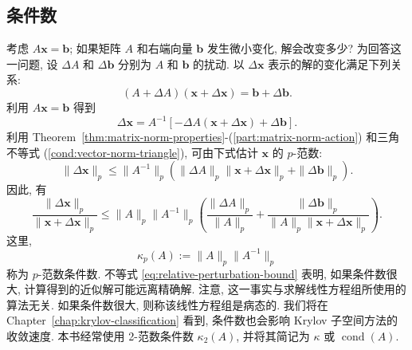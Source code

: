 \subsection{{条件数}}\label{sec:condition-number}
{考虑 $A\bm x=\bm b$; 如果矩阵 $A$ 和右端向量 $\bm b$ 发生微小变化, 解会改变多少? 为回答这一问题, 设 $\Delta A$ 和 $\Delta\bm b$ 分别为 $A$ 和 $\bm b$ 的扰动. 以 $\Delta\bm x$ 表示的解的变化满足下列关系:}
\[
(A+\Delta A)(\bm x+\Delta\bm x)=\bm b+\Delta\bm b.
\]
{利用 $A\bm x=\bm b$ 得到}
\[
\Delta\bm x=A^{-1}[-\Delta A(\bm x+\Delta\bm x)+\Delta\bm b].
\]
{利用 Theorem~\ref{thm:matrix-norm-properties}-(\ref{part:matrix-norm-action}) 和三角不等式 (\ref{cond:vector-norm-triangle}), 可由下式估计 $\bm x$ 的 $p$-范数:}
\[
\|\Delta\bm x\|_p\le\|A^{-1}\|_p(\|\Delta A\|_p\|\bm x+\Delta\bm x\|_p+\|\Delta\bm b\|_p).
\]
{因此, 有}
\begin{equation}\label{eq:relative-perturbation-bound}
\frac{\|\Delta\bm x\|_p}{\|\bm x+\Delta\bm x\|_p}
\le\|A\|_p\|A^{-1}\|_p
\left(\frac{\|\Delta A\|_p}{\|A\|_p}+
\frac{\|\Delta\bm b\|_p}{\|A\|_p\|\bm x+\Delta\bm x\|_p}\right).
\end{equation}
{这里,}
\begin{equation}\label{eq:p-norm-condition-number}
\kappa_p(A):=\|A\|_p\|A^{-1}\|_p
\end{equation}
{称为 $p$-范数条件数. 不等式 \eqref{eq:relative-perturbation-bound} 表明, 如果条件数很大, 计算得到的近似解可能远离精确解. 注意, 这一事实与求解线性方程组所使用的算法无关.}
{\leavevmode{}\label{idx:chapter-01-section-02:ill-conditioning}如果条件数很大, 则称该线性方程组是病态的. 我们将在 Chapter~\ref{chap:krylov-classification} 看到, 条件数也会影响 Krylov 子空间方法的收敛速度.}
{本书经常使用 2-范数条件数 $\kappa_2(A)$, 并将其简记为 $\kappa$ 或 $\operatorname{cond}(A)$.}
